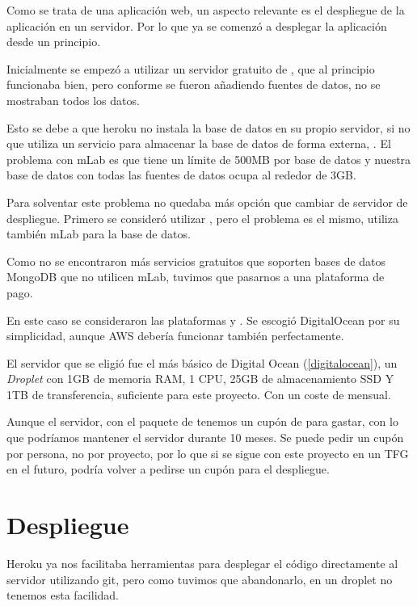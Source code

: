 Como se trata de una aplicación web, un aspecto relevante es el despliegue de la aplicación en un servidor. Por lo que ya se comenzó a desplegar la aplicación desde un principio.

Inicialmente se empezó a utilizar un servidor gratuito de , que al principio funcionaba bien, pero conforme se fueron añadiendo fuentes de datos, no se mostraban todos los datos.

Esto se debe a que heroku no instala la base de datos en su propio servidor, si no que utiliza un servicio para almacenar la base de datos de forma externa, . El problema con mLab es que tiene un límite de 500MB por base de datos y nuestra base de datos con todas las fuentes de datos ocupa al rededor de 3GB.

Para solventar este problema no quedaba más opción que cambiar de servidor de despliegue. Primero se consideró utilizar , pero el problema es el mismo, utiliza también mLab para la base de datos.

Como no se encontraron más servicios gratuitos que soporten bases de datos MongoDB que no utilicen mLab, tuvimos que pasarnos a una plataforma de pago.

En este caso se consideraron las plataformas  y . Se escogió DigitalOcean por su simplicidad, aunque AWS debería funcionar también perfectamente.

El servidor que se eligió fue el más básico de Digital Ocean (\ref{digitalocean}), un \textit{Droplet} con 1GB de memoria RAM, 1 CPU, 25GB de almacenamiento SSD Y 1TB de transferencia, suficiente para este proyecto. Con un coste de  mensual.

Aunque el servidor, con el paquete de  tenemos un cupón de  para gastar, con lo que podríamos mantener el servidor durante 10 meses. Se puede pedir un cupón por persona, no por proyecto, por lo que si se sigue con este proyecto en un TFG en el futuro, podría volver a pedirse un cupón para el despliegue.

\section{Despliegue}

Heroku ya nos facilitaba herramientas para desplegar el código directamente al servidor utilizando git, pero como tuvimos que abandonarlo, en un droplet no tenemos esta facilidad.

